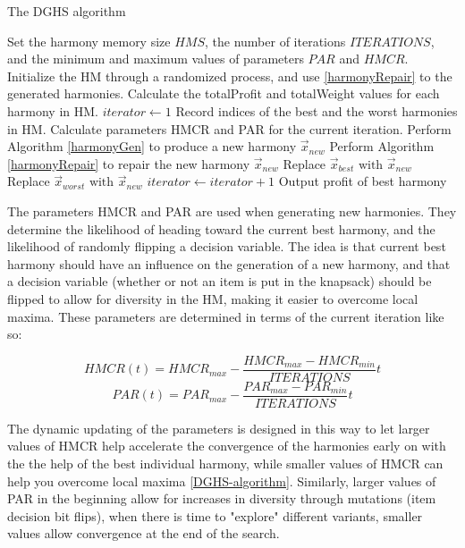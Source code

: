 \documentclass[titlepage]{article}
\begin{document}
\vskip 0.5cm
\begin{breakablealgorithm}
\caption{The DGHS algorithm}\label{DGHS}
    \begin{algorithmic}[1]
        \State Set the harmony memory size $HMS$, the number of iterations $ITERATIONS$, and the minimum and maximum values of parameters $PAR$ and $HMCR$.
        \State Initialize the HM through a randomized process, and use \ref{harmonyRepair} to the generated harmonies. Calculate the totalProfit and totalWeight values for each harmony in HM.
        \State $iterator \gets 1$
            \State Record indices of the best and the worst harmonies in HM.
            \State Calculate parameters HMCR and PAR for the current iteration.
            \State Perform Algorithm \ref{harmonyGen} to produce a new harmony $\Vec{x}_{new}$
            \State Perform Algorithm \ref{harmonyRepair} to repair the new harmony $\Vec{x}_{new}$
                \State Replace $\Vec{x}_{best} \text{ with } \Vec{x}_{new}$
                \State Replace $\Vec{x}_{worst} \text{ with } \Vec{x}_{new}$
            \EndIf
            \State $iterator \gets iterator+1$
        \EndWhile
        \State Output profit of best harmony
    \end{algorithmic}
\end{breakablealgorithm}
\vskip 0.5cm

The parameters HMCR and PAR are used when generating new harmonies. They determine the likelihood of heading toward the current best harmony, and the likelihood of randomly flipping a decision variable. The idea is that current best harmony should have an influence on the generation of a new harmony, and that a decision variable (whether or not an item is put in the knapsack) should be flipped to allow for diversity in the HM, making it easier to overcome local maxima. These parameters are determined in terms of the current iteration like so:

\begin{equation}
    HMCR(t) = HMCR_{max} - \frac{HMCR_{max}-HMCR_{min}}{ITERATIONS} t
\end{equation}
\begin{equation}
    PAR(t) = PAR_{max} - \frac{PAR_{max}-PAR_{min}}{ITERATIONS} t
\end{equation}

The dynamic updating of the parameters is designed in this way to let larger values of HMCR help accelerate the convergence of the harmonies early on with the the help of the best individual harmony, while smaller values of HMCR can help you overcome local maxima \ref{DGHS-algorithm}. Similarly, larger values of PAR in the beginning allow for increases in diversity through mutations (item decision bit flips), when there is time to "explore" different variants, smaller values allow convergence at the end of the search. 
\end{document}
